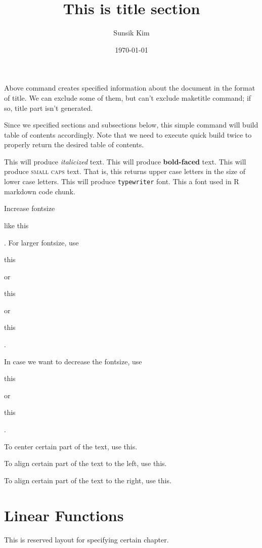 \documentclass[11pt]{article}
\begin{document}
\title{This is title section}
\author{Sunsik Kim}
\date{\today}
\maketitle
Above command creates specified information about the document in the format of title.
We can exclude some of them, but can't exclude maketitle command; if so, title part isn't generated.

\tableofcontents
Since we specified sections and subsections below, this simple command will build table
of contents accordingly. Note that we need to execute quick build twice to properly
return the desired table of contents.

This will produce \textit{italicized} text. 
This will produce \textbf{bold-faced} text.
This will produce \textsc{small caps} text. That is, this returns upper case
letters in the size of lower case letters.
This will produce \texttt{typewriter} font. This a font used in R markdown code
chunk.

Increase fontsize 
\begin{large} like this \end{large}. 
For larger fontsize, use 
\begin{LARGE} this \end{LARGE} or 
\begin{huge} this \end{huge} or 
\begin{Huge} this \end{Huge}.

In case we want to decrease the fontsize, use 
\begin{small} this \end{small} or 
\begin{tiny} this \end{tiny}.

\begin{center}
To center certain part of the text, use this.
\end{center}

\begin{flushleft}
To align certain part of the text to the left, use this.
\end{flushleft}

\begin{flushright}
To align certain part of the text to the right, use this.
\end{flushright}

\section{Linear Functions}
This is reserved layout for specifying certain chapter.
\end{document}
